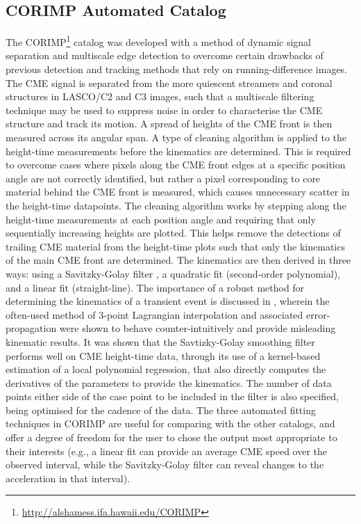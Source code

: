 \documentclass[referee,a4paper,12pt,traditabstract]{swsc}
\begin{document}
\subsection{CORIMP Automated Catalog}
\label{sect_corimp}

The CORIMP\footnote{\href{http://alshamess.ifa.hawaii.edu/CORIMP/}{http://alshamess.ifa.hawaii.edu/CORIMP}} catalog was developed with a method of dynamic signal separation and multiscale edge detection to overcome certain drawbacks of previous detection and tracking methods that rely on running-difference images. The CME signal is separated from the more quiescent streamers and coronal structures in LASCO/C2 and C3 images, such that a multiscale filtering technique may be used to suppress noise in order to characterise the CME structure and track its motion. A spread of heights of the CME front is then measured across its angular span. A type of cleaning algorithm is applied to the height-time measurements before the kinematics are determined. This is required to overcome cases where pixels along the CME front edges at a specific position angle are not correctly identified, but rather a pixel corresponding to core material behind the CME front is measured, which causes unnecessary scatter in the height-time datapoints. The cleaning algorithm works by stepping along the height-time measurements at each position angle and requiring that only sequentially increasing heights are plotted. This helps remove the detections of trailing CME material from the height-time plots such that only the kinematics of the main CME front are determined. The kinematics are then derived in three ways: using a Savitzky-Golay filter \citep{Savitzky-Golay1964}, a quadratic fit (second-order polynomial), and a linear fit (straight-line). The importance of a robust method for determining the kinematics of a transient event is discussed in \cite{2013A&A...557A..96B}, wherein the often-used method of 3-point Lagrangian interpolation and associated error-propagation were shown to behave counter-intuitively and provide misleading kinematic results. It was shown that the Savtizky-Golay smoothing filter performs well on CME height-time data, through its use of a kernel-based estimation of a local polynomial regression, that also directly computes the derivatives of the parameters to provide the kinematics. The number of data points either side of the case point to be included in the filter is also specified, being optimised for the cadence of the data. The three automated fitting techniques in CORIMP are useful for comparing with the other catalogs, and offer a degree of freedom for the user to chose the output most appropriate to their interests (e.g., a linear fit can provide an average CME speed over the observed interval, while the Savitzky-Golay filter can reveal changes to the acceleration in that interval).
\end{document}
